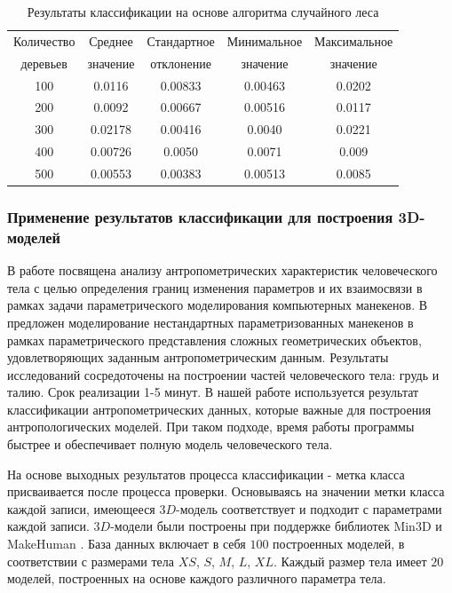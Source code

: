 \begin{table}[b!]%
\begin{center}
\caption{Результаты классификации на основе алгоритма случайного леса \cite{long1,long2}}\label{tab6}
  \begin{tabular}{|c|c|c|c|c|}
    \hline
  Количество  & Среднее   &   Стандартное   & Минимальное   & Максимальное \\
деревьев     & значение  &    отклонение   & значение      &значение      \\
\hline
100	&0.0116	&0.00833	&0.00463	&0.0202\\
\hline
200	&0.0092	&0.00667	&0.00516	&0.0117 \\
\hline
300	&0.02178	&0.00416	&0.0040	&0.0221\\
\hline
400	&0.00726	&0.0050	&0.0071	&0.009\\
\hline
500	&0.00553	&0.00383	&0.00513	&0.0085\\
\hline
  \end{tabular}
\end{center}
\end{table}%

\subsubsection{Применение результатов классификации для построения 3D-моделей}
В работе \cite{grudinin2009} посвящена анализу антропометрических характеристик человеческого тела с целью определения границ изменения параметров и их взаимосвязи в рамках задачи параметрического моделирования компьютерных манекенов. В \cite{grudinin2014} предложен моделирование нестандартных параметризованных манекенов в рамках параметрического представления сложных геометрических объектов, удовлетворяющих заданным антропометрическим данным. Результаты исследований сосредоточены на построении частей человеческого тела: грудь и талию. Срок реализации 1-5 минут. В нашей работе используется результат классификации антропометрических данных, которые важные для построения антропологических моделей. При таком подходе, время работы программы быстрее и обеспечивает полную модель человеческого тела.

На основе выходных результатов процесса классификации - метка класса присваивается после процесса проверки. Основываясь на значении метки класса каждой записи, имеющееся $3D$-модель соответствует и подходит с параметрами каждой записи. $3D$-модели были построены при поддержке библиотек Min3D \cite{Min3D} и MakeHuman \cite{Make}. База данных включает в себя $100$ построенных моделей, в соответствии с размерами тела $XS$, $S$, $M$, $L$, $XL$. Каждый размер тела имеет $20$ моделей, построенных на основе каждого различного параметра тела.

